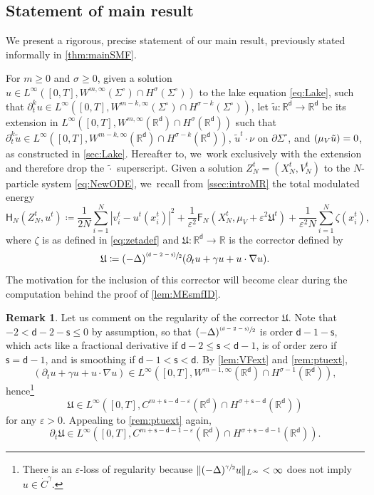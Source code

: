 \documentclass[JEP,XML,SOM,Unicode,published]{cedram}
\let\epsilon\varepsilon
\newcommand{\psfrac}[2]{\sfrac{(#1)}{#2}}
\newcommand{\Sigmacirc}{\Sigma^\circ}
\theoremstyle{plain}
\theoremstyle{definition}
\newtheorem{remark}[thm]{Remark}
\DeclarePairedDelimiter{\pa}{\lparen}{\rparen}
\let\div\relax
\DeclareMathOperator{\div}{\mathrm{div}}
\newcommand{\R}{{\mathbb{R}}}
\let\ga\gamma
\let\D\Delta
\let\vep\varepsilon
\let\p\partial
\let\tl\tilde
\let\ux X
\let\uz Z
\newcommand{\Uu}{\mathfrak{U}}
\newcommand{\Fr}{\mathsf{F}}
\newcommand{\Hr}{\mathsf{H}}
\renewcommand{\d}{\mathsf{d}}
\newcommand{\s}{\mathsf{s}}
\begin{document}
\subsection{Statement of main result}\label{ssec:MPmr}

We present a rigorous, precise statement of our main result, previously stated informally in \cref{thm:mainSMF}.

For $m\ge 0$ and $\sigma\ge 0$, given a solution $u \in L^\infty([0,T], W^{m,\infty}(\Sigmacirc) \cap H^\sigma(\Sigmacirc))$ to the lake equation \eqref{eq:Lake}, such that $\p_t^k u \in L^\infty([0,T], W^{m-k,\infty}(\Sigmacirc)\cap H^{\sigma-k}(\Sigmacirc))$, let $\tl u:\R^\d\to\R^\d$ be its extension in $L^\infty([0,T], W^{m,\infty}(\R^\d) \cap H^\sigma(\R^\d))$ such that $\p_t^k\tl{u} \in L^\infty([0,T], W^{m-k,\infty}(\R^\d)\cap H^{\sigma-k}(\R^\d))$, $\tl{u}^t\cdot\nu$ on $\p\Sigma^\circ$, and $\div(\mu_V\tl{u})=0$, as constructed in \cref{sec:Lake}. Hereafter to, we~work exclusively with the extension and therefore drop the $\tl{\cdot}$ superscript. Given a solution $\uz_N^t = (\ux_N^t,V_N^t)$ to the $N$-particle system \eqref{eq:NewODE}, we~recall from \cref{ssec:introMR} the {total modulated energy}\vspace*{-3pt}\enlargethispage{\baselineskip}
\begin{equation}\label{eq:MEcon}
\Hr_{N}(\uz_N^t,u^t) \coloneqq \frac{1}{2N}\sum_{i=1}^N |v_i^t-u^t(x_i^t)|^2 + \frac{1}{\vep^2}\Fr_N(\ux_N^t,\mu_V+\vep^2\Uu^t) + \frac{1}{\vep^2 N}\sum_{i=1}^N \zeta(x_i^t),
\end{equation}
where $\zeta$ is as defined in \eqref{eq:zetadef} and $\Uu:\R^\d\to\R$ is the corrector defined by\vspace*{-3pt}
\begin{equation}\label{eq:Uudef}
\Uu \coloneqq (-\D)^{\psfrac{\d-2-\s}{2}}\div\pa*{\p_t u+\ga u + u\cdot\nabla u}.
\end{equation}
The motivation for the inclusion of this corrector will become clear during the computation behind the proof of \cref{lem:MEsmfID}.

\begin{remark}
Let us comment on the regularity of the corrector $\Uu$. Note that $-2 <\d-2-\s \le 0$ by assumption, so that $(-\D)^{\psfrac{\d-2-\s}{2}}\div$ is order $\d-1-\s$, which acts like a fractional derivative if $\d-2\leq \s<\d-1$, is of order zero if $\s=\d-1$, and is smoothing if $\d-1<\s<\d$. By \cref{lem:VFext} and \cref{rem:ptuext},\vspace*{-3pt}
\[
(\p_t u+\ga u + u\cdot\nabla u)\in L^\infty([0,T], W^{m-1,\infty}(\R^\d) \cap H^{\sigma-1}(\R^\d)),
\]
hence\footnote{There is an $\epsilon$-loss of regularity because $\|(-\Delta)^{\sfrac{\ga}{2}}u\|_{L^\infty} < \infty$ does not imply $u\in \dot{C}^{\ga}$.}\vspace*{-3pt}
\[
\Uu \in L^\infty([0,T], C^{m+\s-\d-\epsilon}(\R^\d)\cap H^{\sigma+\s-\d}(\R^\d))
\]
for any $\epsilon>0$. Appealing to \cref{rem:ptuext} again,\vspace*{-3pt}
\[
\p_t\Uu\in L^\infty([0,T], C^{m+\s-\d-1-\epsilon}(\R^\d)\cap H^{\sigma+\s-\d-1}(\R^\d)).
\]
\end{remark}
\end{document}
